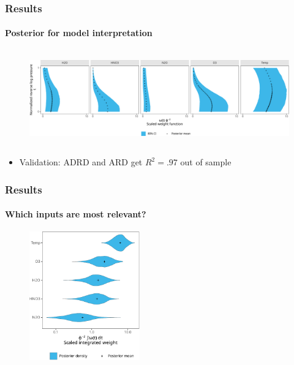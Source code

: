 \documentclass{snedecorbeamer}
\begin{document}
\begin{frame}
  \frametitle{Results}
  \framesubtitle{Posterior for model interpretation}

  \begin{figure}
    \centering
    \includegraphics[height=11em]{inc/mls_weight_posterior.pdf}
  \end{figure}
  \vfill{}
  \begin{itemize}
  \item Validation: ADRD and ARD get $R^2 = .97$ out of sample
  \end{itemize}

\end{frame}

\begin{frame}
  \frametitle{Results}
  \framesubtitle{Which inputs are most relevant?}

  \begin{figure}
    \centering
    \includegraphics[height=15em]{inc/mls_weight_integral.pdf}
  \end{figure}

\end{frame}
\end{document}
